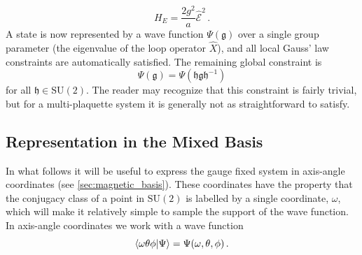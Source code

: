 \documentclass[reprint,superscriptaddress,pra,nofootinbib,preprintnumbers,floatfix]{revtex4-1}
\providecommand{\sutwo}{$\mathrm{SU}(2)$\xspace}
\providecommand{\g}{{\mathfrak{g}}}
\providecommand{\h}{{\mathfrak{h}}}
\begin{document}
%
\begin{equation}
    H_E = \frac{2g^2}{a} \hat{\mathcal{E}}^2 \,.
\end{equation}
%
A state is now represented by a wave function $\Psi(\g)$ over a single group parameter (the eigenvalue of the loop operator $\hat X$), and all local Gauss' law constraints are automatically satisfied. 
%
The remaining global constraint is
%
\begin{equation}\label{eq:one_plaq_global_constraint}
    \Psi(\g) = \Psi(\h \g \h^{-1})
\end{equation}
for all $\h \in \mathrm{SU}(2)$. 
%
The reader may recognize that this constraint is fairly trivial, but for a multi-plaquette system it is generally not as straightforward to satisfy.



\subsection{Representation in the Mixed Basis}
In what follows it will be useful to express the gauge fixed system in axis-angle coordinates (see \cref{sec:magnetic_basis}). 
%
These coordinates have the property that the conjugacy class of a point in \sutwo is labelled by a single coordinate, $\omega$, which will make it relatively simple to sample the support of the wave function.
%
In axis-angle coordinates we work with a wave function
%
\begin{equation}\label{eq:psi_axis_angle}
    \braket{\omega\theta\phi}{\Psi} = \Psi(\omega,\theta,\phi) \,.
\end{equation}
\end{document}
